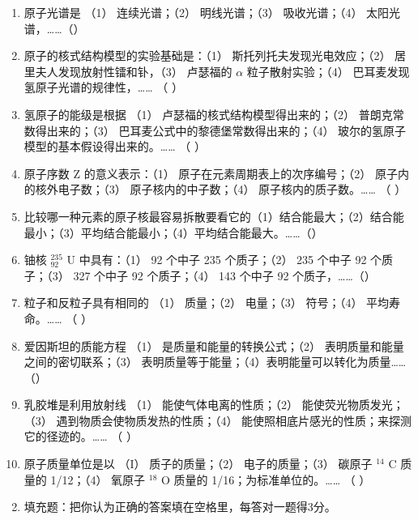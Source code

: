 \begin{enumerate}
\item
  原子光谱是 （1） 连续光谱；（2） 明线光谱；（3） 吸收光谱；（4）
  太阳光谱，\ldots\ldots（）
\item
  原子的核式结构模型的实验基础是：（1） 斯托列托夫发现光电效应；（2）
  居里夫人发现放射性镭和钋，（3） 卢瑟福的 \(\alpha\)
  粒子散射实验；（4） 巴耳麦发现氢原子光谱的规律性，\ldots\ldots{} （ ）
\item
  氢原子的能级是根据 （1） 卢瑟福的核式结构模型得出来的；（2）
  普朗克常数得出来的；（3） 巴耳麦公式中的黎德堡常数得出来的；（4）
  玻尔的氢原子模型的基本假设得出来的。\ldots\ldots{} （ ）
\item
  原子序数 Z 的意义表示：（1） 原子在元素周期表上的次序编号；（2）
  原子内的核外电子数；（3） 原子核内的中子数；（4）
  原子核内的质子数。\ldots\ldots{} （ ）
\item
  比较哪一种元素的原子核最容易拆散要看它的（1）结合能最大；（2）结合能最小；（3）平均结合能最小；（4）平均结合能最大。\ldots\ldots（）
\item
  铀核 \(^{235}_{92}\) U 中具有：（1） 92 个中子 235 个质子；（2） 235
  个中子 92 个质子；（3） 327 个中子 92 个质子；（4） 143 个中子 92
  个质子，\ldots\ldots（）
\item
  粒子和反粒子具有相同的 （1） 质量；（2） 电量；（3） 符号；（4）
  平均寿命。\ldots\ldots{} （ ）
\item
  爱因斯坦的质能方程 （1） 是质量和能量的转换公式；（2）
  表明质量和能量之间的密切联系；（3）
  表明质量等于能量；（4）表明能量可以转化为质量\ldots\ldots（）
\item
  乳胶堆是利用放射线 （1） 能使气体电离的性质；（2）
  能使荧光物质发光；（3） 遇到物质会使物质发热的性质；（4）
  能使照相底片感光的性质；来探测它的径迹的。\ldots\ldots{} （ ）
\item
  原子质量单位是以 （I） 质子的质量；（2） 电子的质量；（3） 碳原子
  \(^{14}\) C 质量的 1/12；（4） 氧原子 \(^{18}\) O 质量的
  1/16；为标准单位的。\ldots\ldots{} （ ）
\end{enumerate}

\begin{enumerate}[label=\Roman*.]
\setcounter{enumi}{1}
\item
  填充题：把你认为正确的答案填在空格里，每答对一题得3分。
\end{enumerate}


